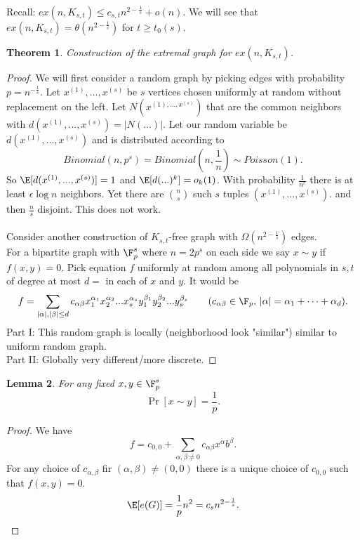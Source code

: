 \documentclass[a4paper]{article}
\newtheorem{thm}{Theorem}[section]
\newtheorem{lem}[thm]{Lemma}
\begin{document}
Recall: $ex(n,K_{s,t})\leq c_{s,t}n^{2-\frac{1}{s}}+o(n)$. We will see that $ex(n,K_{s,t})=\theta \left(  n^{2-\frac{1}{s}} \right)$ for $t\geq t_0(s)$.
\begin{thm}
    Construction of the extremal graph for $ex(n,K_{s,t})$.
\end{thm}
\begin{proof}
    We will first consider a random graph by picking edges with probability $p=n^{-\frac{1}{s}}$. Let $x^{(1)},...,x^{(s)}$ be $s$ vertices chosen uniformly at random without replacement on the left. Let $N(x^{(1),...,x^{(s)}})$ that are the common neighbors with $d(x^{(1)},...,x^{(s)})=|N(...)|$. Let our random variable be $d(x^{(1)},...,x^{(s)})$ and is distributed according to \[
    Binomial(n,p^s)=Binomial\left (n,\frac{1}{n}\right )\sim Poisson(1)
    .\] 
    So $\E[d(x^{(1)},...,x^{(s)})]=1$ and $\E[d(...)^k]=o_k(1)$. With probability $\frac{1}{n^\epsilon}$ there is at least $\epsilon \log n$ neighbors. Yet there are ${n \choose s}$ such $s$ tuples $(x^{(1)},...,x^{(s)})$. and then $\frac{n}{s}$ disjoint. This does not work. \\\\
    Consider another construction of $K_{s,t}$-free graph with $\Omega(n^{2-\frac{1}{s}})$ edges. \\
    For a bipartite graph with $\F_p^s$ where $n=2p^s$ on each side we say $x\sim y$ if $f(x,y)=0$. Pick equation $f$ uniformly at random among all polynomials in $s, t$ of degree at most $d=$ in each of $x$ and $y.$ It would be \[
    f=\sum_{|\alpha|,|\beta|\leq d}c_{\alpha \beta}x_1^{\alpha_1}x_2^{\alpha_2}...x_s^{\alpha_s}y_1^{\beta_1}y_2^{\beta_2}...y_s^{\beta_s} \tag{$c_{\alpha \beta}\in \F_p$, $|\alpha|=\alpha_1+\cdots+\alpha_d$}
    .\] 
    Part I: This random graph is locally (neighborhood look "similar") similar to uniform random graph.\\
    Part II: Globally very different/more discrete.
\end{proof}
\begin{lem}
    For any fixed $x,y\in \F_p^s$ \[
    \Pr[x\sim y]=\frac{1}{p}
    .\]
\end{lem}
\begin{proof}
    We have \[
        f=c_{0,0}+\sum_{\alpha, \beta\neq 0}c_{\alpha \beta}x^\alpha b^\beta
    .\] 
    For any choice of $c_{\alpha, \beta}$ fir $(\alpha, \beta)\neq (0,0)$ there is a unique choice of $c_{0,0}$ such that $f(x,y)=0.$ \[
    \E[e(G)]=\frac{1}{p}n^2=c_sn^{2-\frac{1}{s}}
    .\]
\end{proof}
\end{document}

